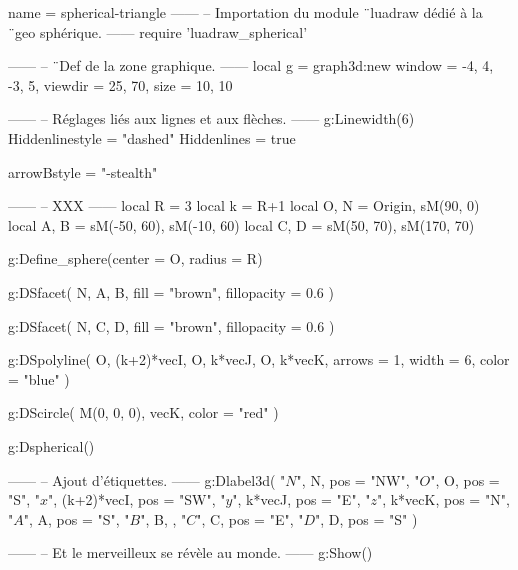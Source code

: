 \documentclass{standalone}
\begin{document}
\begin{luadraw}{name = spherical-triangle}
------
-- Importation du module ¨luadraw dédié à la ¨geo sphérique.
------
require 'luadraw_spherical'

------
-- ¨Def de la zone graphique.
------
local g = graph3d:new{
  window  = {-4, 4, -3, 5},
  viewdir = {25, 70},
  size    = {10, 10}
}

------
-- Réglages liés aux lignes et aux flèches.
------
g:Linewidth(6)
Hiddenlinestyle = "dashed"
Hiddenlines     = true

arrowBstyle = "-stealth"

------
-- XXX
------
local R =  3
local k = R+1
local O, N = Origin, sM(90, 0)
local A, B = sM(-50, 60), sM(-10, 60)
local C, D = sM(50, 70), sM(170, 70)

g:Define_sphere({center = O, radius = R})

g:DSfacet(
  {N, A, B},
  {fill = "brown", fillopacity = 0.6}
)

g:DSfacet(
  {N, C, D},
  {fill = "brown", fillopacity = 0.6}
)

g:DSpolyline(
  {
    {O, (k+2)*vecI},
    {O, k*vecJ},
    {O, k*vecK}},
    {arrows = 1, width = 6, color = "blue"}
)

g:DScircle(
  {M(0, 0, 0), vecK},
  {color = "red"}
)

g:Dspherical()

------
-- Ajout d'étiquettes.
------
g:Dlabel3d(
  "$N$", N, {pos = "NW"},
  "$O$", O, {pos = "S"},
  "$x$", (k+2)*vecI, {pos = "SW"},
  "$y$", k*vecJ, {pos = "E"},
  "$z$", k*vecK, {pos = "N"},
  "$A$", A, {pos = "S"},
  "$B$", B, {},
  "$C$", C, {pos = "E"},
  "$D$", D, {pos = "S"}
)

------
-- Et le merveilleux se révèle au monde.
------
g:Show()
\end{luadraw}
\end{document}
